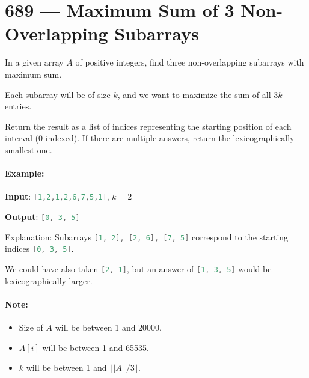 \section{689 --- Maximum Sum of 3 Non-Overlapping Subarrays}
In a given array $A$ of positive integers, find three non-overlapping subarrays with maximum sum.

Each subarray will be of size $k$, and we want to maximize the sum of all $3k$ entries.

Return the result as a list of indices representing the starting position of each interval (0-indexed). If there are multiple answers, return the lexicographically smallest one.

\paragraph{Example:}

\begin{flushleft}
\textbf{Input}: \lstinline[language=C++, basicstyle=\small\ttfamily, keywordstyle=\bfseries\color{green!40!black}]|[1,2,1,2,6,7,5,1]|,  $k=2$

\textbf{Output}: \lstinline[language=C++, basicstyle=\small\ttfamily, keywordstyle=\bfseries\color{green!40!black}]|[0, 3, 5]|

Explanation: Subarrays \lstinline[language=C++, basicstyle=\small\ttfamily, keywordstyle=\bfseries\color{green!40!black}]|[1, 2], [2, 6], [7, 5]| correspond to the starting indices \lstinline[language=C++, basicstyle=\small\ttfamily, keywordstyle=\bfseries\color{green!40!black}]|[0, 3, 5]|.

We could have also taken \lstinline[language=C++, basicstyle=\small\ttfamily, keywordstyle=\bfseries\color{green!40!black}]|[2, 1]|, but an answer of \lstinline[language=C++, basicstyle=\small\ttfamily, keywordstyle=\bfseries\color{green!40!black}]|[1, 3, 5]| would be lexicographically larger.
\end{flushleft}
 

\paragraph{Note:}

\begin{itemize}
\item Size of $A$ will be between 1 and 20000.
\item $A[i]$ will be between 1 and 65535.
\item $k$ will be between 1 and $\lfloor \lvert A\rvert\ /3 \rfloor$.
\end{itemize}

